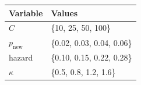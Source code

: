 \begin{table}
  \centering\footnotesize
  \setlength{\tabcolsep}{5pt}\renewcommand{\arraystretch}{1.05}
  
  
  \begin{tabular}{@{}ll@{}}
    \toprule
    \textbf{Variable} & \textbf{Values} \\
    \midrule
    $C$                & \{10, 25, 50, 100\} \\
    $p_{\mathrm{new}}$ & \{0.02, 0.03, 0.04, 0.06\} \\
    hazard             & \{0.10, 0.15, 0.22, 0.28\} \\
    $\kappa$           & \{0.5, 0.8, 1.2, 1.6\} \\
    \bottomrule
  \end{tabular}
\end{table}